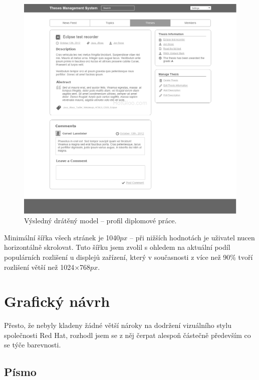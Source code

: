 \begin{figure}[htbp]
    \centering
    \includegraphics[width=\textwidth]{images/main-layout.png}
    \caption{Výsledný drátěný model -- profil diplomové práce.}
    \label{img:layout1}
\end{figure}

Minimální šířka všech stránek je 1040$px$ -- při nižších hodnotách je uživatel nucen horizontálně skrolovat. Tuto šířku jsem zvolil s ohledem na aktuální podíl populárních rozlišení u displejů zařízení, který v současnosti z více než 90\% tvoří rozlišení větší než 1024$\times$768$px$\footnotemark[1].


\section{Grafický návrh}

Přesto, že nebyly kladeny žádné větší nároky na dodržení vizuálního stylu společnosti Red Hat, rozhodl jsem se z něj čerpat alespoň částečně především co se týče barevnosti.

\subsection{Písmo}

